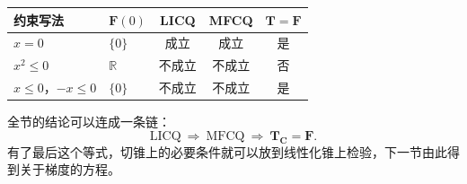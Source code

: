 \begin{BookInlineTable}
  \centering
  \begin{tabular}{@{}llccc@{}}
    \toprule
    约束写法 & $\bm{F}(0)$ & LICQ & MFCQ & $\bm{T}=\bm{F}$\\
    \midrule
    $x=0$ & $\{0\}$ & 成立 & 成立 & 是\\
    $x^2\leq0$ & $\mathbb{R}$ & 不成立 & 不成立 & 否\\
    $x\leq0$，$-x\leq0$ & $\{0\}$ & 不成立 & 不成立 & 是\\
    \bottomrule
  \end{tabular}
  \caption{同一可行集$\{0\}$的三种写法。切锥恒为$\{0\}$，线性化锥与约束资格随写法改变。}
  \label{tab:kkt-three-writings}
\end{BookInlineTable}

全节的结论可以连成一条链：
\[
 \text{LICQ}\ \Longrightarrow\ \text{MFCQ}\ \Longrightarrow\ \bm{T}_{\bm{C}}=\bm{F}.
\]
有了最后这个等式，切锥上的必要条件就可以放到线性化锥上检验，下一节由此得到关于梯度的方程。
